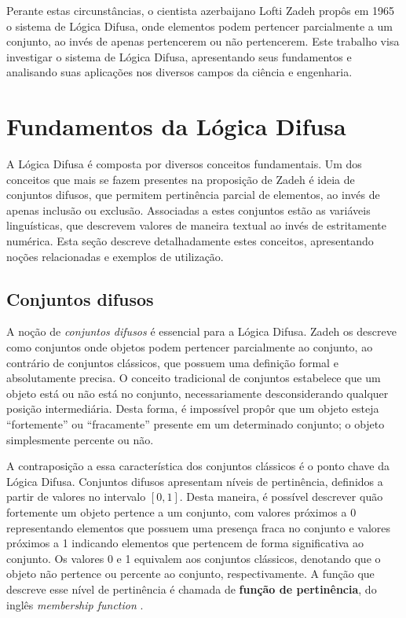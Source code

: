 \documentclass[12pt]{article}
\begin{document}
Perante estas circunstâncias, o cientista azerbaijano Lofti Zadeh propôs em 1965 o sistema de Lógica Difusa, onde elementos podem pertencer parcialmente a um conjunto, ao invés de apenas pertencerem ou não pertencerem. Este trabalho visa investigar o sistema de Lógica Difusa, apresentando seus fundamentos e analisando suas aplicações nos diversos campos da ciência e engenharia.

\section{Fundamentos da Lógica Difusa} \label{sec:fundaments}

A Lógica Difusa é composta por diversos conceitos fundamentais. Um dos conceitos que mais se fazem presentes na proposição de Zadeh é ideia de conjuntos difusos, que permitem pertinência parcial de elementos, ao invés de apenas inclusão ou exclusão. Associadas a estes conjuntos estão as variáveis linguísticas, que descrevem valores de maneira textual ao invés de estritamente numérica. Esta seção descreve detalhadamente estes conceitos, apresentando noções relacionadas e exemplos de utilização.

\subsection{Conjuntos difusos}

A noção de \textit{conjuntos difusos} é essencial para a Lógica Difusa. Zadeh os descreve como conjuntos onde objetos podem pertencer parcialmente ao conjunto, ao contrário de conjuntos clássicos, que possuem uma definição formal e absolutamente precisa. O conceito tradicional de conjuntos estabelece que um objeto está ou não está no conjunto, necessariamente desconsiderando qualquer posição intermediária. Desta forma, é impossível propôr que um objeto esteja ``fortemente'' ou ``fracamente'' presente em um determinado conjunto; o objeto simplesmente percente ou não.

A contraposição a essa característica dos conjuntos clássicos é o ponto chave da Lógica Difusa. Conjuntos difusos apresentam níveis de pertinência, definidos a partir de valores no intervalo $[0, 1]$. Desta maneira, é possível descrever quão fortemente um objeto pertence a um conjunto, com valores próximos a 0 representando elementos que possuem uma presença fraca no conjunto e valores próximos a 1 indicando elementos que pertencem de forma significativa ao conjunto. Os valores 0 e 1 equivalem aos conjuntos clássicos, denotando que o objeto não pertence ou percente ao conjunto, respectivamente. A função que descreve esse nível de pertinência é chamada de \textbf{função de pertinência}, do inglês \textit{membership function} \cite{Zadeh1965}.
\end{document}
